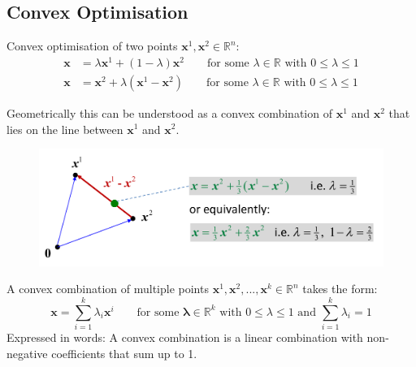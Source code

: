 \documentclass[11pt]{article}
\begin{document}
\subsection{Convex Optimisation}
Convex optimisation of two points $\textbf{x}^1, \textbf{x}^2\in\mathbb{R}^n$:
\begin{align*}
	\textbf{x} &= \lambda\textbf{x}^1 + (1-\lambda) \textbf{x}^2\qquad\text{for some }\lambda\in\mathbb{R}\text{ with }0\leq\lambda\leq 1\\
	\textbf{x} &= \textbf{x}^2 + \lambda(\textbf{x}^1 - \textbf{x}^2)\qquad\text{for some }\lambda\in\mathbb{R}\text{ with }0\leq\lambda\leq 1
\end{align*}

\noindent
Geometrically this can be understood as a convex combination of $\textbf{x}^1$ and $\textbf{x}^2$ that lies on the line between $\textbf{x}^1$ and $\textbf{x}^2$.

\begin{figure}[H]
	\centering
	\includegraphics[width=0.7\linewidth, keepaspectratio]{convex_combination}
	\label{fig:convexcombination}
\end{figure}

\noindent
A convex combination of multiple points $ \textbf{x}^1, \textbf{x}^2,...,\textbf{x}^k\in\mathbb{R}^n$ takes the form:
\begin{equation*}
	\textbf{x} = \sum_{i=1}^{k} \lambda_i \textbf{x}^i\qquad \text{for some }\boldsymbol{\lambda}\in\mathbb{R}^k\text{ with }0\leq\lambda\leq 1\text{ and }\sum_{i=1}^{k} \lambda_i = 1
\end{equation*}
\noindent
Expressed in words: A convex combination is a linear combination with non-negative coefficients that sum up to 1.
\end{document}
